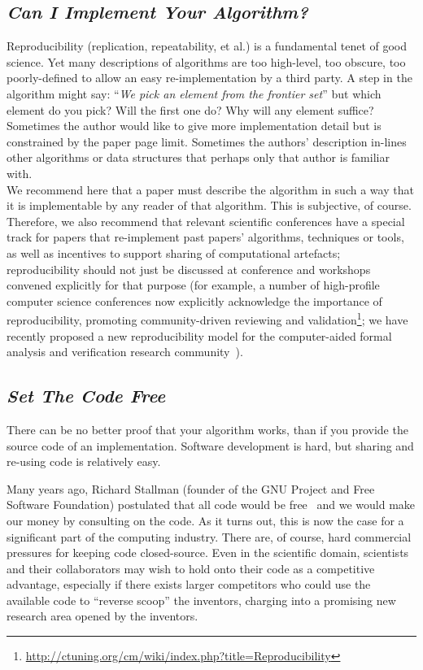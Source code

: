 \documentclass[a4paper,11pt]{article}
\begin{document}
\subsection{{\emph{Can I Implement Your Algorithm?}}}

Reproducibility (replication, repeatability, et al.) is a fundamental tenet of
good science. Yet many descriptions of algorithms are too high-level,
too obscure, too poorly-defined to allow an easy re-implementation by
a third party. A step in the algorithm might say: ``{\emph{We pick an
element from the frontier set}}'' but which element do you pick? Will
the first one do?  Why will any element suffice? Sometimes the author
would like to give more implementation detail but is constrained by
the paper page limit. Sometimes the authors' description in-lines
other algorithms or data structures that perhaps only that author is
familiar with.\\

 We recommend here
that a paper must describe the algorithm in such a way that it is
implementable by any reader of that algorithm. This is subjective, of
course. Therefore, we also recommend that relevant scientific
conferences have a special track for papers that re-implement past
papers' algorithms, techniques or tools, as well as incentives to
support sharing of computational artefacts; reproducibility should not
just be discussed at conference and workshops convened explicitly for
that purpose (for example, a number of high-profile computer science
conferences now explicitly acknowledge the importance of
reproducibility, promoting community-driven reviewing and
validation\footnote{\url{http://ctuning.org/cm/wiki/index.php?title=Reproducibility}};
we have recently proposed a new reproducibility model for the
computer-aided formal analysis and verification research
community~\cite{crick-et-al-cav}).


\subsection{{\emph{Set The Code Free}}}

There can be no better proof that your algorithm works, than if you
provide the source code of an implementation. Software development is
hard, but sharing and re-using code is relatively easy.

Many years ago, Richard Stallman (founder of the GNU Project and Free
Software Foundation) postulated that all code would be
free~\cite{rms:2010} and we would make our money by consulting on the
code.  As it turns out, this is now the case for a significant
part of the computing industry. There are, of course, hard commercial
pressures for keeping code closed-source. Even in the scientific
domain, scientists and their collaborators may wish to hold onto their
code as a competitive advantage, especially if there exists larger
competitors who could use the available code to ``reverse scoop'' the
inventors, charging into a promising new research area opened by the
inventors.
\end{document}
